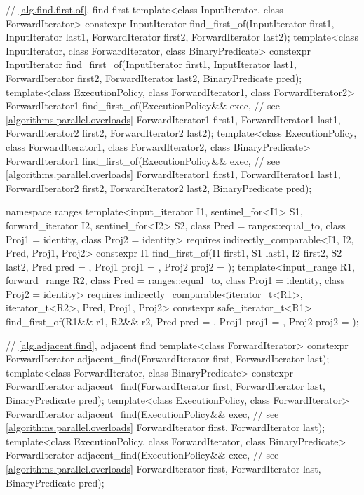 \begin{codeblock}
{  // \ref{alg.find.first.of}, find first
  template<class InputIterator, class ForwardIterator>
    constexpr InputIterator
      find_first_of(InputIterator first1, InputIterator last1,
                    ForwardIterator first2, ForwardIterator last2);
  template<class InputIterator, class ForwardIterator, class BinaryPredicate>
    constexpr InputIterator
      find_first_of(InputIterator first1, InputIterator last1,
                    ForwardIterator first2, ForwardIterator last2,
                    BinaryPredicate pred);
  template<class ExecutionPolicy, class ForwardIterator1, class ForwardIterator2>
    ForwardIterator1
      find_first_of(ExecutionPolicy&& exec,                     // see \ref{algorithms.parallel.overloads}
                    ForwardIterator1 first1, ForwardIterator1 last1,
                    ForwardIterator2 first2, ForwardIterator2 last2);
  template<class ExecutionPolicy, class ForwardIterator1,
           class ForwardIterator2, class BinaryPredicate>
    ForwardIterator1
      find_first_of(ExecutionPolicy&& exec,                     // see \ref{algorithms.parallel.overloads}
                    ForwardIterator1 first1, ForwardIterator1 last1,
                    ForwardIterator2 first2, ForwardIterator2 last2,
                    BinaryPredicate pred);

  namespace ranges {
    template<input_iterator I1, sentinel_for<I1> S1, forward_iterator I2, sentinel_for<I2> S2,
             class Pred = ranges::equal_to, class Proj1 = identity, class Proj2 = identity>
      requires indirectly_comparable<I1, I2, Pred, Proj1, Proj2>
      constexpr I1 find_first_of(I1 first1, S1 last1, I2 first2, S2 last2,
                                 Pred pred = {},
                                 Proj1 proj1 = {}, Proj2 proj2 = {});
    template<input_range R1, forward_range R2,
             class Pred = ranges::equal_to, class Proj1 = identity, class Proj2 = identity>
      requires indirectly_comparable<iterator_t<R1>, iterator_t<R2>, Pred, Proj1, Proj2>
      constexpr safe_iterator_t<R1>
        find_first_of(R1&& r1, R2&& r2,
                      Pred pred = {},
                      Proj1 proj1 = {}, Proj2 proj2 = {});
  }

  // \ref{alg.adjacent.find}, adjacent find
  template<class ForwardIterator>
    constexpr ForwardIterator
      adjacent_find(ForwardIterator first, ForwardIterator last);
  template<class ForwardIterator, class BinaryPredicate>
    constexpr ForwardIterator
      adjacent_find(ForwardIterator first, ForwardIterator last,
                    BinaryPredicate pred);
  template<class ExecutionPolicy, class ForwardIterator>
    ForwardIterator
      adjacent_find(ExecutionPolicy&& exec,                     // see \ref{algorithms.parallel.overloads}
                    ForwardIterator first, ForwardIterator last);
  template<class ExecutionPolicy, class ForwardIterator, class BinaryPredicate>
    ForwardIterator
      adjacent_find(ExecutionPolicy&& exec,                     // see \ref{algorithms.parallel.overloads}
                    ForwardIterator first, ForwardIterator last,
                    BinaryPredicate pred);

}
\end{codeblock}
